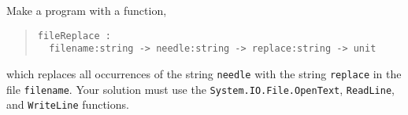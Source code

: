 Make a program with a function,
\begin{quote}
  \lstinline!fileReplace :!
  \\\noindent\lstinline!  filename:string -> needle:string -> replace:string -> unit!
\end{quote}
which replaces all occurrences of the string \lstinline!needle! with the string \lstinline!replace! in the file \lstinline!filename!. Your solution must use the \lstinline{System.IO.File.OpenText}, \lstinline{ReadLine}, and \lstinline{WriteLine} functions.
